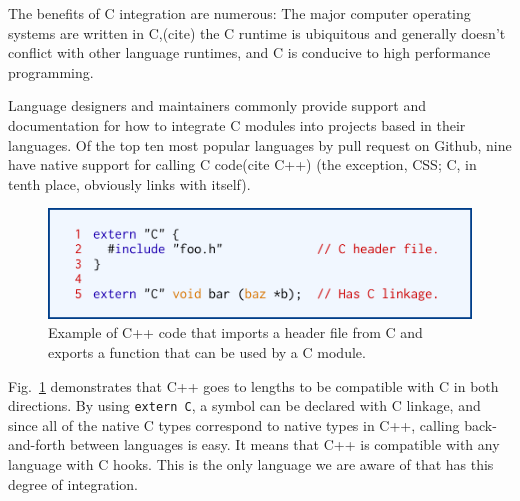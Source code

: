 The benefits of C integration are numerous: The major computer operating systems are written in C,(cite) the C runtime is ubiquitous and generally doesn't conflict with other language runtimes, and C is conducive to high performance programming.

Language designers and maintainers commonly provide support and documentation for how to integrate C modules into projects based in their languages.  Of the top ten most popular languages by pull request on Github\cite{Octoverse}, nine have native support for calling C code\cite{JavascriptCiface}\cite{PythonCiface}\cite{JavaCiface}\cite{RubyCiface}\cite{PHPCiface}\cite{DotNetCiface}\cite{GoCiface}(cite C++) (the exception, CSS; C, in tenth place, obviously links with itself).

\begin{figure}[htbp!]
        \centering
        \includegraphics[scale=0.25]{gfx/extern}
        \caption{Example of C++ code that imports a header file from C and exports a function that can be used by a C module.}
        \label{fig:extern-example}
\end{figure}

Fig.~\ref{fig:extern-example} demonstrates that C++ goes to lengths to be compatible with C in both directions.  By using \texttt{extern \textquotedbl{}C\textquotedbl{}}, a symbol can be declared with C linkage, and since all of the native C types correspond to native types in C++, calling back-and-forth between languages is easy.  It means that C++ is compatible with any language with C hooks.  This is the only language we are aware of that has this degree of integration.
